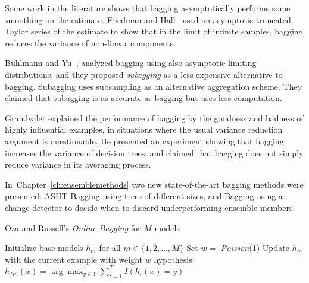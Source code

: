 Some work in the literature shows that bagging asymptotically performs some smoothing on the estimate. Friedman and Hall~\cite{Friedman99onbagging} used an asymptotic truncated Taylor series of the estimate to show that in the limit of infinite samples, bagging reduces the variance of non-linear components.

B\"uhlmann and Yu~\cite{yu-bag}, analyzed bagging using also asymptotic limiting distributions, and they proposed {\em subagging} as a less expensive alternative to bagging. Subagging uses subsampling as an alternative aggregation scheme. They claimed that subagging is as accurate as bagging but uses less computation.


Grandvalet\cite{Grandvalet04} explained the performance of bagging by the goodness and badness of highly influential examples, in situations where the usual variance reduction argument is questionable. He presented an experiment showing that bagging increases the variance of decision trees, and claimed that bagging does not simply reduce variance in its averaging process.


In~Chapter~\ref{ch:ensemblemethods} two new state-of-the-art bagging methods were presented: ASHT Bagging using trees of different sizes, and \adwin Bagging using a change detector to decide when to discard underperforming 
ensemble members. 


\BEGINOMIT
\begin{algorithm}
\caption{Oza and Russell's {\em Online Bagging} for $M$ models} %
\begin{algorithmic}[1]
\STATE Initialize base models $h_{m}$ for all $m \in \{1,2,...,M\}$
\STATE Set $w = $ {\em Poisson}(1)
\STATE Update $h_{m}$ with the current example with weight $w$
\ENDFOR
\ENDFOR
{}
\RETURN hypothesis: $h_{fin}(x) = \arg \max_{y \in Y} \sum_{t=1}^{T} I(h_{t}(x) = y)$
\end{algorithmic}
\label{alg:ozabag}
\end{algorithm}
\ENDOMIT


